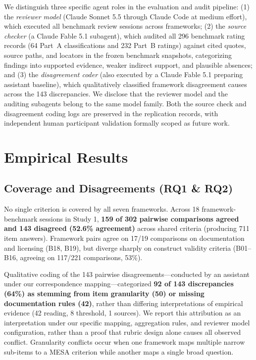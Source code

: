 \documentclass[runningheads]{llncs}
\begin{document}
We distinguish three specific agent roles in the evaluation and audit pipeline: (1) the \emph{reviewer model} (Claude Sonnet 5.5 through Claude Code at medium effort), which executed all benchmark review sessions across frameworks; (2) the \emph{source checker} (a Claude Fable 5.1 subagent), which audited all 296 benchmark rating records (64 Part~A classifications and 232 Part~B ratings) against cited quotes, source paths, and locators in the frozen benchmark snapshots, categorizing findings into supported evidence, weaker indirect support, and plausible absences; and (3) the \emph{disagreement coder} (also executed by a Claude Fable 5.1 preparing assistant baseline), which qualitatively classified framework disagreement causes across the 143 discrepancies. We disclose that the reviewer model and the auditing subagents belong to the same model family. Both the source check and disagreement coding logs are preserved in the replication records, with independent human participant validation formally scoped as future work.

\section{Empirical Results}
\label{sec:results}

\subsection{Coverage and Disagreements (RQ1 \& RQ2)}
No single criterion is covered by all seven frameworks. Across 18 framework-benchmark sessions in Study 1, \textbf{159 of 302 pairwise comparisons agreed and 143 disagreed (52.6\% agreement)} across shared criteria (producing 711 item answers). Framework pairs agree on 17/19 comparisons on documentation and licensing (B18, B19), but diverge sharply on construct validity criteria (B01--B16, agreeing on 117/221 comparisons, 53\%). 

Qualitative coding of the 143 pairwise disagreements---conducted by an assistant under our correspondence mapping---categorized \textbf{92 of 143 discrepancies (64\%) as stemming from item granularity (50) or missing documentation rules (42)}, rather than differing interpretations of empirical evidence (42 reading, 8 threshold, 1 sources). We report this attribution as an interpretation under our specific mapping, aggregation rules, and reviewer model configuration, rather than a proof that rubric design alone causes all observed conflict. Granularity conflicts occur when one framework maps multiple narrow sub-items to a MESA criterion while another maps a single broad question.
\end{document}
